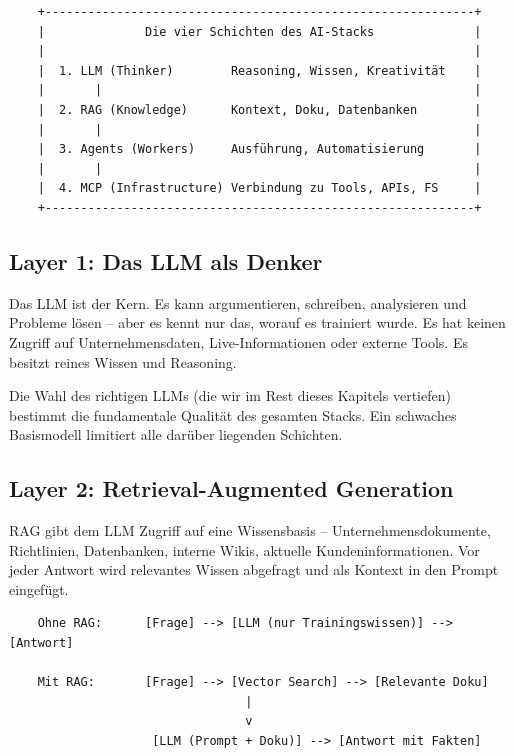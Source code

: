 \begin{verbatim}
    +------------------------------------------------------------+
    |              Die vier Schichten des AI-Stacks              |
    |                                                            |
    |  1. LLM (Thinker)        Reasoning, Wissen, Kreativität    |
    |       |                                                    |
    |  2. RAG (Knowledge)      Kontext, Doku, Datenbanken        |
    |       |                                                    |
    |  3. Agents (Workers)     Ausführung, Automatisierung       |
    |       |                                                    |
    |  4. MCP (Infrastructure) Verbindung zu Tools, APIs, FS     |
    +------------------------------------------------------------+
\end{verbatim}

\subsection{Layer 1: Das LLM als Denker}

Das LLM ist der Kern. Es kann argumentieren, schreiben, analysieren und Probleme lösen -- aber es kennt nur das, worauf es trainiert wurde. Es hat keinen Zugriff auf Unternehmensdaten, Live-Informationen oder externe Tools. Es besitzt reines Wissen und Reasoning.

Die Wahl des richtigen LLMs (die wir im Rest dieses Kapitels vertiefen) bestimmt die fundamentale Qualität des gesamten Stacks. Ein schwaches Basismodell limitiert alle darüber liegenden Schichten.

\subsection{Layer 2: Retrieval-Augmented Generation}

RAG gibt dem LLM Zugriff auf eine Wissensbasis -- Unternehmensdokumente, Richtlinien, Datenbanken, interne Wikis, aktuelle Kundeninformationen. Vor jeder Antwort wird relevantes Wissen abgefragt und als Kontext in den Prompt eingefügt.

\begin{verbatim}
    Ohne RAG:      [Frage] --> [LLM (nur Trainingswissen)] --> [Antwort]
    
    Mit RAG:       [Frage] --> [Vector Search] --> [Relevante Doku]
                                 |
                                 v
                    [LLM (Prompt + Doku)] --> [Antwort mit Fakten]
\end{verbatim}

